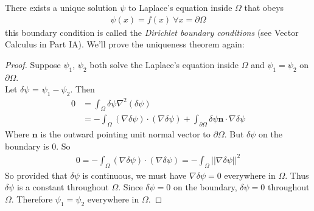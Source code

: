 \documentclass[a4paper]{article}
\begin{document}
There exists a unique solution $\psi$ to Laplace's equation inside $\Omega$ that obeys 
\begin{equation*}
\begin{aligned}
\psi\left(x\right) = f\left(x\right) \ \forall x = \partial \Omega
\end{aligned}
\end{equation*}
this boundary condition is called the \emph{Dirichlet boundary conditions} (see Vector Calculus in Part IA). We'll prove the uniqueness theorem again:
\begin{proof}
Suppose $\psi_1$, $\psi_2$ both solve the Laplace's equation inside $\Omega$ and $\psi_1 = \psi_2$ on $\partial \Omega$.\\
Let $\delta \psi$ = $\psi_1 - \psi_2$. Then
\begin{equation*}
\begin{aligned}
0 &= \int_\Omega \delta\psi\nabla^2 \left(\delta\psi\right)\\
&= -\int_\Omega \left(\nabla\delta\psi\right)\cdot\left(\nabla\delta\psi\right) + \int_{\partial\Omega}\delta\psi \mathbf{n} \cdot \nabla \delta \psi
\end{aligned}
\end{equation*}
Where $\mathbf{n}$ is the outward pointing unit normal vector to $\partial \Omega$. But $\delta \psi$ on the boundary is $0$. So
\begin{equation*}
\begin{aligned}
0=-\int_\Omega\left(\nabla\delta\psi\right)\cdot\left(\nabla\delta\psi\right) = -\int_\Omega ||\nabla\delta\psi||^2
\end{aligned}
\end{equation*}
So provided that $\delta \psi$ is continuous, we must have $\nabla\delta\psi = 0$ everywhere in $\Omega$. Thus $\delta\psi$ is a constant throughout $\Omega$. Since $\delta \psi = 0$ on the boundary, $\delta \psi = 0$ throughout $\Omega$. Therefore $\psi_1 = \psi_2$ everywhere in $\Omega$.
\end{proof}
\end{document}
